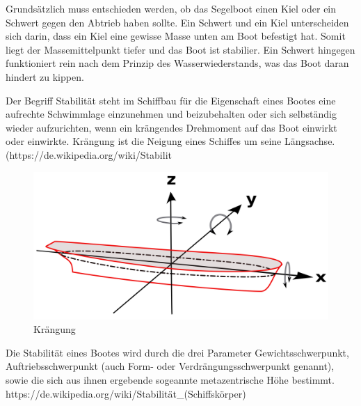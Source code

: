 Grundsätzlich muss entschieden werden, ob das Segelboot einen Kiel oder ein Schwert gegen den Abtrieb haben sollte. Ein Schwert und ein Kiel unterscheiden sich darin, dass ein Kiel eine gewisse Masse unten am Boot befestigt hat. Somit liegt der Massemittelpunkt tiefer und das Boot ist stabilier.
Ein Schwert hingegen funktioniert rein nach dem Prinzip des Wasserwiederstands, was das Boot daran hindert zu kippen.


Der Begriff Stabilität steht im Schiffbau für die Eigenschaft eines Bootes eine aufrechte Schwimmlage einzunehmen und beizubehalten oder sich selbständig wieder aufzurichten, wenn ein krängendes Drehmoment auf das Boot einwirkt oder einwirkte. Krängung ist die Neigung eines Schiffes um seine Längsachse. (https://de.wikipedia.org/wiki/Stabilit%
\begin{figure}
    \centering
    \includegraphics[width=0.5\linewidth]{assets/Achsen_Schiffsbewegung.svg.png}
    \caption{Krängung}
    \label{fig:enter-label}
\end{figure}
Die Stabilität eines Bootes wird durch die drei Parameter Gewichtsschwerpunkt, Auftriebsschwerpunkt (auch Form- oder Verdrängungsschwerpunkt genannt), sowie die sich aus ihnen ergebende sogeannte metazentrische Höhe bestimmt. 
https://de.wikipedia.org/wiki/Stabilität_(Schiffskörper)

